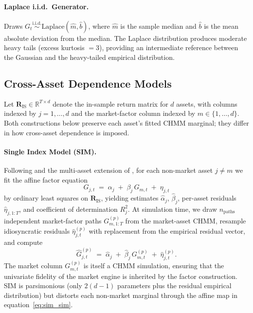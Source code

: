 \paragraph{Laplace i.i.d.\ Generator.}
Draws $G_t \overset{\text{i.i.d.}}{\sim} \text{Laplace}(\hat{m}, \hat{b})$, where $\hat{m}$ is the sample median and $\hat{b}$ is the mean absolute deviation from the median.
The Laplace distribution produces moderate heavy tails (excess kurtosis $= 3$), providing an intermediate reference between the Gaussian and the heavy-tailed empirical distribution.

\subsection{Cross-Asset Dependence Models}
\label{sec:cross_asset_methods}

Let $\mathbf{R}_{\text{IS}} \in \mathbb{R}^{T \times d}$ denote the in-sample return matrix for $d$ assets, with columns indexed by $j = 1, \ldots, d$ and the market-factor column indexed by $m \in \{1, \ldots, d\}$.
Both constructions below preserve each asset's fitted CHMM marginal; they differ in how cross-asset dependence is imposed.

\paragraph{Single Index Model (SIM).}
Following \citet{sharpe1963simplified} and the multi-asset extension of \citet{alswaidan2026hybrid}, for each non-market asset $j \neq m$ we fit the affine factor equation
\begin{equation}
    G_{j,t} \;=\; \alpha_j \;+\; \beta_j\, G_{m,t} \;+\; \eta_{j,t}
    \label{eq:sim}
\end{equation}
by ordinary least squares on $\mathbf{R}_{\text{IS}}$, yielding estimates $\hat{\alpha}_j$, $\hat{\beta}_j$, per-asset residuals $\hat{\eta}_{j,1:T}$, and coefficient of determination $R^2_j$.
At simulation time, we draw $n_{\text{paths}}$ independent market-factor paths $G_{m,1:T}^{(p)}$ from the market-asset CHMM, resample idiosyncratic residuals $\hat{\eta}_{j,t}^{(p)}$ with replacement from the empirical residual vector, and compute
\begin{equation}
    \hat{G}_{j,t}^{(p)} \;=\; \hat{\alpha}_j \;+\; \hat{\beta}_j\, G_{m,t}^{(p)} \;+\; \hat{\eta}_{j,t}^{(p)}.
    \label{eq:sim_sim}
\end{equation}
The market column $G_{m,t}^{(p)}$ is itself a CHMM simulation, ensuring that the univariate fidelity of the market engine is inherited by the factor construction.
SIM is parsimonious (only $2(d-1)$ parameters plus the residual empirical distribution) but distorts each non-market marginal through the affine map in equation~\eqref{eq:sim_sim}.

